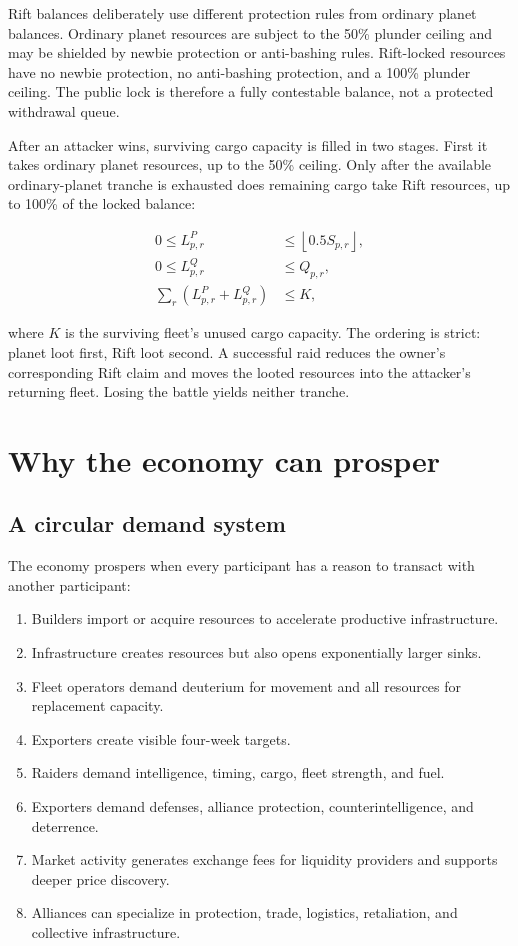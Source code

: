 \documentclass[11pt]{article}
\begin{document}
Rift balances deliberately use different protection rules from ordinary planet balances. Ordinary planet resources are subject to the 50\% plunder ceiling and may be shielded by newbie protection or anti-bashing rules. Rift-locked resources have no newbie protection, no anti-bashing protection, and a 100\% plunder ceiling. The public lock is therefore a fully contestable balance, not a protected withdrawal queue.

After an attacker wins, surviving cargo capacity is filled in two stages. First it takes ordinary planet resources, up to the 50\% ceiling. Only after the available ordinary-planet tranche is exhausted does remaining cargo take Rift resources, up to 100\% of the locked balance:

\begin{align}
0\le L^{P}_{p,r} &\le \left\lfloor0.5S_{p,r}\right\rfloor,\\
0\le L^{Q}_{p,r} &\le Q_{p,r},\\
\sum_r\left(L^{P}_{p,r}+L^{Q}_{p,r}\right) &\le K,
\end{align}

where $K$ is the surviving fleet's unused cargo capacity. The ordering is strict: planet loot first, Rift loot second. A successful raid reduces the owner's corresponding Rift claim and moves the looted resources into the attacker's returning fleet. Losing the battle yields neither tranche.

\section{Why the economy can prosper}

\subsection{A circular demand system}

The economy prospers when every participant has a reason to transact with another participant:

\begin{enumerate}
  \item Builders import or acquire resources to accelerate productive infrastructure.
  \item Infrastructure creates resources but also opens exponentially larger sinks.
  \item Fleet operators demand deuterium for movement and all resources for replacement capacity.
  \item Exporters create visible four-week targets.
  \item Raiders demand intelligence, timing, cargo, fleet strength, and fuel.
  \item Exporters demand defenses, alliance protection, counterintelligence, and deterrence.
  \item Market activity generates exchange fees for liquidity providers and supports deeper price discovery.
  \item Alliances can specialize in protection, trade, logistics, retaliation, and collective infrastructure.
\end{enumerate}
\end{document}
